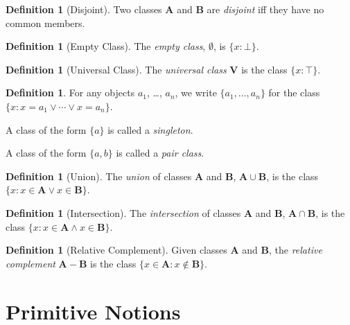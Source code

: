\documentclass{report}
\theoremstyle{definition}
\newtheorem{definition}[axiom]{Definition}
\begin{document}
    \begin{definition}[Disjoint]
        Two classes $\mathbf{A}$ and $\mathbf{B}$ are \emph{disjoint} iff they have no common members.
    \end{definition}

    \begin{definition}[Empty Class]
        The \emph{empty class}, $\emptyset$, is $\{ x : \bot \}$.
    \end{definition}

    \begin{definition}[Universal Class]
        The \emph{universal class} $\mathbf{V}$ is the class $\{ x : \top \}$.
    \end{definition}

    \begin{definition}
        For any objects $a_1$, \ldots, $a_n$, we write $\{ a_1, \ldots, a_n \}$ for the class
        $\{ x : x = a_1 \vee \cdots \vee x = a_n \}$.

        A class of the form $\{a\}$ is called a \emph{singleton}.

        A class of the form $\{a,b\}$ is called a \emph{pair class}.
    \end{definition}

    \begin{definition}[Union]
        The \emph{union} of classes $\mathbf{A}$ and $\mathbf{B}$, 
        $\mathbf{A} \cup \mathbf{B}$, is the class $\{ x : x \in \mathbf{A} \vee x \in \mathbf{B} \}$.
    \end{definition}

    \begin{definition}[Intersection]
        The \emph{intersection} of classes $\mathbf{A}$ and $\mathbf{B}$, 
        $\mathbf{A} \cap \mathbf{B}$, is the class $\{ x : x \in \mathbf{A} \wedge x \in \mathbf{B} \}$.
    \end{definition}

    \begin{definition}[Relative Complement]
        Given classes $\mathbf{A}$ and $\mathbf{B}$, the \emph{relative complement}
        $\mathbf{A} - \mathbf{B}$ is the class $\{ x \in \mathbf{A} : x \notin \mathbf{B} \}$.
    \end{definition}

    \section{Primitive Notions}
\end{document}
